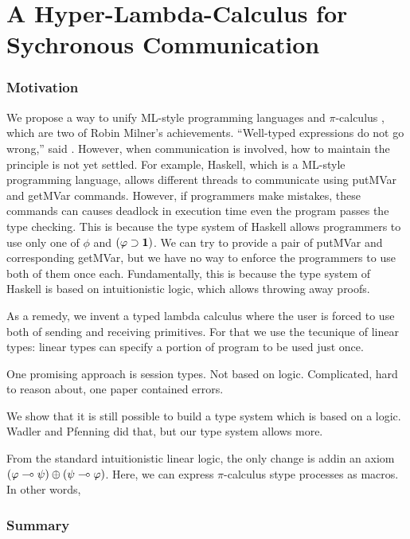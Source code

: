 \chapter{A Hyper-Lambda-Calculus for Sychronous Communication}
\label{ch:exchange}

\subsection{Motivation}

We propose a way to unify ML-style programming languages  and
$\pi$-calculus , which are two of Robin Milner's achievements.
``Well-typed expressions do not go wrong,'' said \citet{milner1978}.
However, when communication is involved, how to maintain the principle
is not yet settled.
For example, Haskell, which is a ML-style programming language,
allows different threads to communicate using
putMVar and getMVar commands.
However, if programmers make mistakes, these commands can
causes deadlock in execution time even the program passes the type checking.
This is because the type system of Haskell allows programmers to
use only one of $\phi$ and $(\varphi\supset \mathbf{1})$.
We can try to provide a pair of putMVar and corresponding getMVar,
but we have no way to enforce the programmers to use both of them once
each.
Fundamentally, this is because the type system of Haskell
is based on intuitionistic logic, which allows throwing away proofs.

As a remedy, we invent a typed lambda calculus where
the user is forced to use both of sending and receiving primitives.
For that we use the tecunique of linear types:
linear types can specify a portion of program to be used
just once.


One promising approach is session types.
Not based on logic.  Complicated, hard to reason about, one paper
contained errors.

We show that it is still possible to build
a type system which is based on a logic.
Wadler and Pfenning did that, but our type system allows more.

From the standard intuitionistic linear logic,
the only change is addin an axiom
$(\varphi\multimap\psi)\oplus(\psi\multimap\varphi)$.
Here, we can express $\pi$-calculus stype processes as macros.
In other words,

\subsection{Summary}

